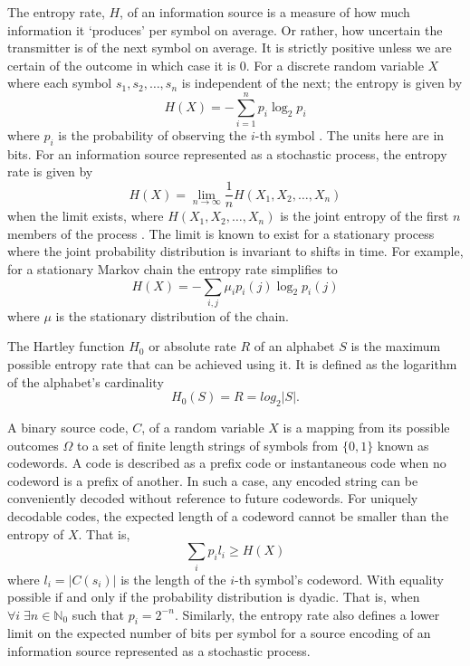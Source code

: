 The entropy rate, $H$, of an information source is a measure of how much information it `produces' per symbol on average. Or rather, how uncertain the transmitter is of the next symbol on average. It is strictly positive unless we are certain of the outcome in which case it is 0. For a discrete random variable $X$ where each symbol $s_1,s_2,\dots,s_n$ is independent of the next; the entropy is given by \[H(X)=-\sum_{i=1}^np_i\log_2p_i\] where $p_i$ is the probability of observing the $i$-th symbol \cite{shannon}. The units here are in bits. For an information source represented as a stochastic process, the entropy rate is given by \[H(X)=\lim_{n\to\infty}\frac{1}{n}H(X_1,X_2,\dots,X_n)\] when the limit exists, where $H(X_1,X_2,\dots,X_n)$ is the joint entropy of the first $n$ members of the process \cite{info-book}. The limit is known to exist for a stationary process where the joint probability distribution is invariant to shifts in time. For example, for a stationary Markov chain the entropy rate simplifies to \[H(X)=-\sum_{i,j}\mu_ip_i(j)\log_2p_i(j)\] where $\mu$ is the stationary distribution of the chain.


The Hartley function $H_0$ or absolute rate $R$ of an alphabet $S$ is the maximum possible entropy rate that can be achieved using it. It is defined as the logarithm of the alphabet's cardinality
\[ H_0(S)=R=log_2|S|.\]


A binary source code, $C$, of a random variable $X$ is a mapping from its possible outcomes $\Omega$ to a set of finite length strings of symbols from $\{0,1\}$ known as codewords. A code is described as a prefix code or instantaneous code when no codeword is a prefix of another. In such a case, any encoded string can be conveniently decoded without reference to future codewords. For uniquely decodable codes, the expected length of a codeword cannot be smaller than the entropy of $X$. That is, \[\sum_i p_il_i\ge H(X)\] where $l_i=|C(s_i)|$ is the length of the $i$-th symbol's codeword. With equality possible if and only if the probability distribution is dyadic. That is, when $\forall i\;\exists n\in\mathbb{N}_0$ such that $p_i=2^{-n}$. Similarly, the entropy rate also defines a lower limit on the expected number of bits per symbol for a source encoding of an information source represented as a stochastic process.%


